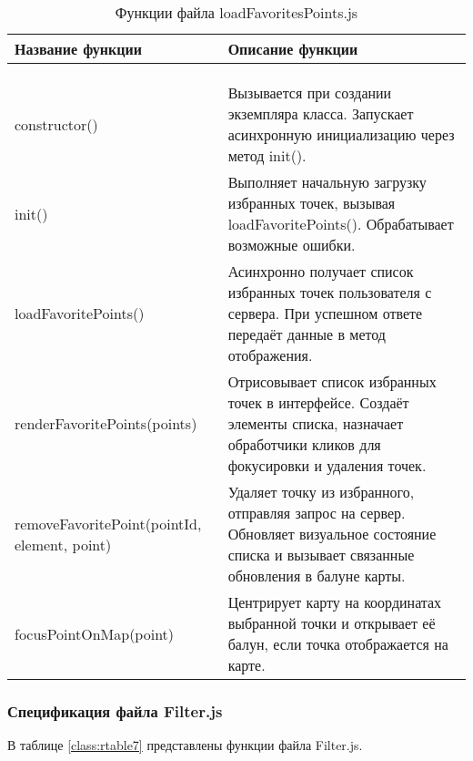 \renewcommand{\arraystretch}{0.8} %
\begin{xltabular}{\textwidth}{|l|X|}
	\caption{Функции файла loadFavoritesPoints.js\label{class:rtable6}}\\
	\hline \centrow Название функции & \centrow Описание функции\\
	\hline {} & \\ \hline
	\endfirsthead
	\\
	\hline {} & \\ \hline
	\finishhead
	constructor() & Вызывается при создании экземпляра класса. Запускает асинхронную инициализацию через метод init().\\
	\hline init() & Выполняет начальную загрузку избранных точек, вызывая loadFavoritePoints(). Обрабатывает возможные ошибки.\\
	\hline loadFavoritePoints() & Асинхронно получает список избранных точек пользователя с сервера. При успешном ответе передаёт данные в метод отображения.\\
	\hline renderFavoritePoints(points) & Отрисовывает список избранных точек в интерфейсе. Создаёт элементы списка, назначает обработчики кликов для фокусировки и удаления точек.\\
	\hline removeFavoritePoint(pointId, element, point) & Удаляет точку из избранного, отправляя запрос на сервер. Обновляет визуальное состояние списка и вызывает связанные обновления в балуне карты.\\
	\hline focusPointOnMap(point) & Центрирует карту на координатах выбранной точки и открывает её балун, если точка отображается на карте.\\
\end{xltabular}

\subsubsection{Спецификация файла Filter.js}

В таблице \ref{class:rtable7} представлены функции файла Filter.js.


